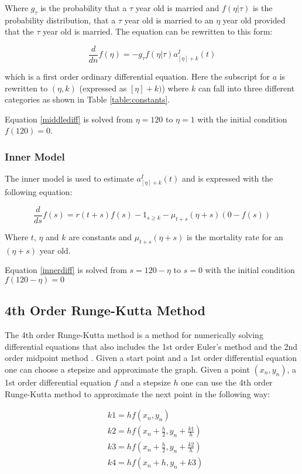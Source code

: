 Where $g_\tau$ is the probability that a $\tau$ year old is married and $f(\eta|\tau)$ is the probability distribution, that a $\tau$ year old is married to an $\eta$ year old provided that the $\tau$ year old is married.
The equation can be rewritten to this form:

\begin{equation}
\frac{d}{dn}f(\eta) = -g_\tau f(\eta|\tau)a_{[\eta]+k}^I(t)
\label{middlediff}
\end{equation}

which is a first order ordinary differential equation. Here the subscript for $a$ is rewritten to $(\eta,k)$ (expressed as  $[\eta] + k)$) where $k$ can fall into three different categories as shown in Table \ref{table:constants}. 

Equation \ref{middlediff} is solved from $\eta = 120$ to $\eta = 1$ with the initial condition $f(120) = 0$.

\subsubsection{Inner Model}
The inner model is used to estimate $a_{[\eta]+k}^I(t)$ and is expressed with the following equation:

\begin{equation}
\frac{d}{ds}f(s) = r(t+s)f(s) - 1_{s \geq k} - \mu_{t+s}(\eta + s)(0 - f(s))
\label{innerdiff}
\end{equation}

Where $t$, $\eta$ and $k$ are constants and $\mu_{t+s}(\eta + s)$ is the mortality rate for an $(\eta + s)$ year old.

Equation \ref{innerdiff} is solved from $s = 120 - \eta$ to $s = 0$ with the initial condition $f(120 - \eta) = 0$

\subsection{4th Order Runge-Kutta Method}
The 4th order Runge-Kutta method is a method for numerically solving differential equations that also includes the 1st order Euler's method \cite{nric} and the 2nd order midpoint method \cite{nric}. Given a start point and a 1st order differential equation one can choose a stepsize and approximate the graph.
Given a point $(x_n,y_n)$, a 1st order differential equation $f$ and a stepsize $h$ one can use the 4th order Runge-Kutta method to approximate the next point in the following way:

\begin{align}
\nonumber &k1 = h f(x_n, y_n) \\
\nonumber &k2 = h f(x_n + \frac{h}{2}, y_n + \frac{k1}{h} ) \\
\nonumber &k3 = h f(x_n + \frac{h}{2}, y_n + \frac{k2}{h} ) \\
&k4 = h f(x_n + h, y_n + k3 )
\label{eq:ks}
\end{align} 

